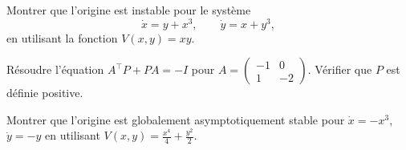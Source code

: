 \begin{exercice}
Montrer que l'origine est instable pour le syst\`eme
\[
    \dot{x} = y + x^3, \qquad \dot{y} = x + y^3,
\]
en utilisant la fonction $V(x,y) = xy$.
\end{exercice}

\begin{exercice}
R\'esoudre l'\'equation $A^\top P + PA = -I$ pour
$A = \begin{pmatrix} -1 & 0 \\ 1 & -2 \end{pmatrix}$.
V\'erifier que $P$ est d\'efinie positive.
\end{exercice}

\begin{exercice}
Montrer que l'origine est globalement asymptotiquement stable pour
$\dot{x} = -x^3$, $\dot{y} = -y$ en utilisant $V(x,y) = \frac{x^4}{4} + \frac{y^2}{2}$.
\end{exercice}
